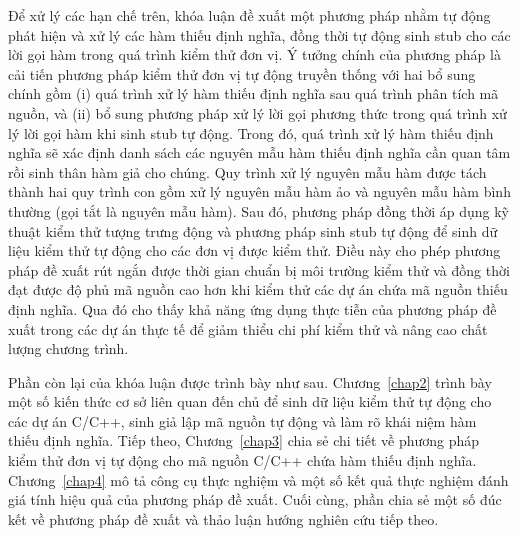 Để xử lý các hạn chế trên, khóa luận đề xuất một phương pháp nhằm tự động phát hiện và xử lý các hàm thiếu định nghĩa, đồng thời tự động sinh stub cho các lời gọi hàm trong quá trình kiểm thử đơn vị. Ý tưởng chính của phương pháp là cải tiến phương pháp kiểm thử đơn vị tự động truyền thống với hai bổ sung chính gồm (i) quá trình xử lý hàm thiếu định nghĩa sau quá trình phân tích mã nguồn, và (ii) bổ sung phương pháp xử lý lời gọi phương thức trong quá trình xử lý lời gọi hàm khi sinh stub tự động. Trong đó, quá trình xử lý hàm thiếu định nghĩa sẽ xác định danh sách các nguyên mẫu hàm thiếu định nghĩa cần quan tâm rồi sinh thân hàm giả cho chúng. Quy trình xử lý nguyên mẫu hàm được tách thành hai quy trình con gồm xử lý nguyên mẫu hàm ảo và nguyên mẫu hàm bình thường (gọi tắt là nguyên mẫu hàm). Sau đó, phương pháp đồng thời áp dụng kỹ thuật kiểm thử tượng trưng động và phương pháp sinh stub tự động để sinh dữ liệu kiểm thử tự động cho các đơn vị được kiểm thử. Điều này cho phép phương pháp đề xuất rút ngắn được thời gian chuẩn bị môi trường kiểm thử và đồng thời đạt được độ phủ mã nguồn cao hơn khi kiểm thử các dự án chứa mã nguồn thiếu định nghĩa. Qua đó cho thấy khả năng ứng dụng thực tiễn của phương pháp đề xuất trong các dự án thực tế để giảm thiểu chi phí kiểm thử và nâng cao chất lượng chương trình.

Phần còn lại của khóa luận được trình bày như sau. Chương~\ref{chap2} trình bày một số kiến thức cơ sở liên quan đến chủ để sinh dữ liệu kiểm thử tự động cho các dự án C/C++, sinh giả lập mã nguồn tự động và làm rõ khái niệm hàm thiếu định nghĩa. Tiếp theo, Chương~\ref{chap3} chia sẻ chi tiết về phương pháp kiểm thử đơn vị tự động cho mã nguồn C/C++ chứa hàm thiếu định nghĩa. Chương~\ref{chap4} mô tả công cụ thực nghiệm và một số kết quả thực nghiệm đánh giá tính hiệu quả của phương pháp đề xuất. Cuối cùng, phần  chia sẻ một số đúc kết về phương pháp đề xuất và thảo luận hướng nghiên cứu tiếp theo.